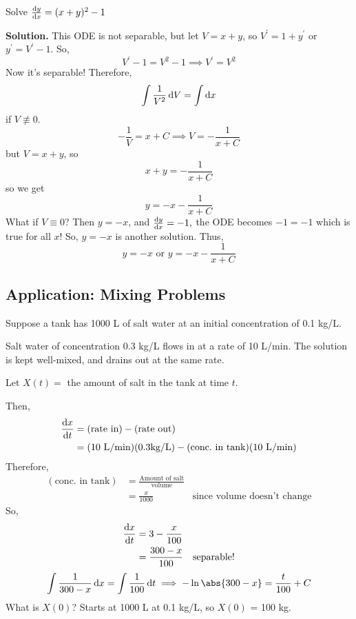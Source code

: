 \begin{Example}{}{}
    Solve
    $ \odv{y}{x} =(x+y)^2-1 $

    \textbf{Solution.} This ODE is not separable, but let $ V=x+y $, so
    $ V^\prime=1+y^\prime $ or $ y^\prime=V^\prime-1 $. So,
    \[ V^\prime-1=V^2-1\implies V^\prime=V^2 \]
    Now it's separable! Therefore,
    \[ \int \frac{1}{V^2}\odif{V} =\int \odif{x} \]
    if $ V\not\equiv 0 $.
    \[ -\frac{1}{V} =x+C\implies V=-\frac{1}{x+C} \]
    but $ V=x+y $, so
    \[ x+y=-\frac{1}{x+C} \]
    so we get
    \[ y=-x-\frac{1}{x+C} \]
    What if $ V\equiv 0 $? Then $ y=-x $, and $ \odv{y}{x}=-1, $ the ODE becomes
    $ -1=-1 $ which is true for all $ x $! So, $ y=-x $ is another solution. Thus,
    \[ y=-x\text{ or }y=-x-\frac{1}{x+C} \]
\end{Example}

\subsection*{Application: Mixing Problems}
Suppose a tank has 1000 L of salt water at an initial concentration of
0.1 kg/L.

Salt water of concentration 0.3 kg/L flows in at a rate of 10 L/min. The solution is
kept well-mixed, and drains out at the same rate.

Let $ X(t)= $ the amount of salt in the tank at time $ t $.

Then,
\begin{align*}
    \odv{x}{t}
     & =(\text{rate in})-(\text{rate out})                                         \\
     & =(10\text{ L/min})(0.3\text{kg/L})-(\text{conc.\ in tank})(10\text{ L/min}) \\
\end{align*}
Therefore,
\begin{align*}
    (\text{conc.\ in tank})
     & =\frac{\text{Amount of salt}}{\text{volume}}                                      \\
     & =\frac{x}{1000}                              & \text{since volume doesn't change}
\end{align*}
So,
\begin{align*}
    \odv{x}{t}
     & =3-\frac{x}{100}                       \\
     & =\frac{300-x}{100} & \text{separable!} \\
\end{align*}
\[ \int \frac{1}{300-x} \odif{x}=\int \frac{1}{100} \odif{t} \implies -\ln\abs{300-x}=\frac{t}{100} +C \]
What is $ X(0) $? Starts at 1000 L at 0.1 kg/L, so $ X(0) $ = 100 kg.

